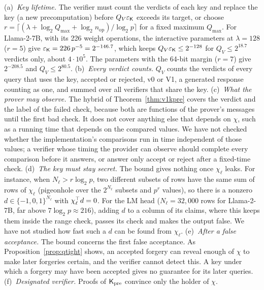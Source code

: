 \begin{remark}
\label{rem:stateful}
(a)~\emph{Key lifetime.} The verifier must count the verdicts of each key and replace the key (a new
precomputation) before $Q_V\varepsilon_{\mathsf{K}}$ exceeds its target, or choose
$r=\lceil(\lambda+\log_2Q_{\max}+\log_2n_{\mathrm{op}})/\log_2p\rceil$ for a fixed maximum
$Q_{\max}$. For Llama-2-7B, with its 226 weight operations, the interactive parameters at
$\lambda=128$ ($r=5$) give $\varepsilon_{\mathsf{K}}=226\,p^{-5}=2^{-146.7}$, which keeps
$Q_V\varepsilon_{\mathsf{K}}\le2^{-128}$ for $Q_V\le2^{18.7}$ verdicts only, about $4\cdot10^5$. The
parameters with the 64-bit margin ($r=7$) give $2^{-208.5}$ and $Q_V\le2^{80.5}$.
(b)~\emph{Every verdict counts.} $Q_V$ counts the verdicts of every query that uses the key, accepted
or rejected, v0 or V1, a generated response counting as one, and summed over all verifiers that
share the key.
(c)~\emph{What the prover may observe.} The hybrid of Theorem~\ref{thm:v1kpre} covers the verdict and
the label of the failed check, because both are functions of the prover's messages until the first
bad check. It does not cover anything else that depends on $\chi$, such as a running time that
depends on the compared values. We have not checked whether the implementation's comparisons run in
time independent of those values; a verifier whose timing the provider can observe should complete
every comparison before it answers, or answer only accept or reject after a fixed-time check.
(d)~\emph{The key must stay secret.} The bound gives nothing once $\chi_\ell$ leaks. For instance,
when $N_\ell>r\log_2p$, two different subsets of rows have the same sum of rows of $\chi_\ell$
(pigeonhole over the $2^{N_\ell}$ subsets and $p^r$ values), so there is a nonzero
$d\in\{-1,0,1\}^{N_\ell}$ with $\chi_\ell^\top d=0$. For the LM head ($N_\ell=32{,}000$ rows for
Llama-2-7B, far above $7\log_2p\approx216$), adding $d$ to a column of its claims, where this keeps
them inside the range check, passes its check and makes the output false. We have not studied how
fast such a $d$ can be found from $\chi_\ell$.
(e)~\emph{After a false acceptance.} The bound concerns the first false acceptance. As
Proposition~\ref{prop:qtight} shows, an accepted forgery can reveal enough of $\chi$ to make later
forgeries certain, and the verifier cannot detect this. A key under which a forgery may have been
accepted gives no guarantee for its later queries.
(f)~\emph{Designated verifier.} Proofs of $\mathsf{K}_{\mathrm{pre}}$ convince only the holder of $\chi$.
\end{remark}

